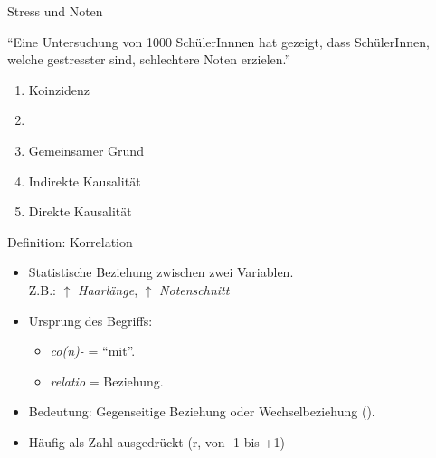 \begin{frame}{Stress und Noten}
    \begin{center}
        ``Eine Untersuchung von 1000 SchülerInnnen hat gezeigt, dass SchülerInnen, welche gestresster sind, schlechtere Noten erzielen.''
    \end{center}
    \begin{enumerate}
        \item Koinzidenz
        \item {}
        \item Gemeinsamer Grund
        \item Indirekte Kausalität
        \item Direkte Kausalität
    \end{enumerate}
\end{frame}

\begin{frame}{Definition: Korrelation}
    \begin{mydefinition}[Korrelation]
    \begin{itemize}[<+->]
        \item Statistische Beziehung zwischen zwei Variablen.\\
              Z.B.: $\uparrow$ \textit{Haarlänge}, $\uparrow$ \textit{Notenschnitt}
        \item Ursprung des Begriffs:
              \begin{itemize}
                  \item \textit{co(n)-} = \enquote{mit}.
                  \item \textit{relatio} = Beziehung.
              \end{itemize}
        \item Bedeutung: Gegenseitige Beziehung oder Wechselbeziehung ().
        \item Häufig als Zahl ausgedrückt (r, von -1 bis +1)
    \end{itemize}
    \end{mydefinition}
\end{frame}

